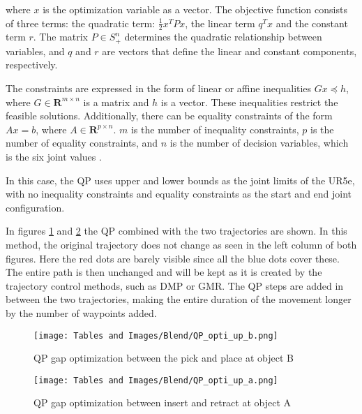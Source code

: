 \documentclass[Setup/main.tex]{subfiles}
\begin{document}
where $x$ is the optimization variable as a vector. The objective function consists of three terms: the quadratic term: $\frac{1}{2}x^T Px$, the linear term $q^Tx$ and the constant term $r$. The matrix $P \in S^n_+$ determines the quadratic relationship between variables, and $q$ and $r$ are vectors that define the linear and constant components, respectively.

The constraints are expressed in the form of linear or affine inequalities $Gx \preceq h$, where $G \in \boldsymbol{R}^{m \times n}$ is a matrix and $h$ is a vector. These inequalities restrict the feasible solutions. Additionally, there can be equality constraints of the form $Ax=b$, where $A \in \boldsymbol{R}^{p \times n}$. $m$ is the number of inequality constraints, $p$ is the number of equality constraints, and $n$ is the number of decision variables, which is the six joint values \cite{cvxbook}. 

In this case, the QP uses upper and lower bounds as the joint limits of the UR5e, with no inequality constraints and equality constraints as the start and end joint configuration.

In figures \ref{fig:QP_opti_up_b} and \ref{fig:QP_opti_up_a} the QP combined with the two trajectories are shown. In this method, the original trajectory does not change as seen in the left column of both figures. Here the red dots are barely visible since all the blue dots cover these. The entire path is then unchanged and will be kept as it is created by the trajectory control methods, such as DMP or GMR. The QP steps are added in between the two trajectories, making the entire duration of the movement longer by the number of waypoints added.

\begin{figure}[H]
    \centering
    \texttt{[image: Tables and Images/Blend/QP\_opti\_up\_b.png]}
    \caption{QP gap optimization between the pick and place at object B}
    \label{fig:QP_opti_up_b}
\end{figure}

\begin{figure}[H]
    \centering
    \texttt{[image: Tables and Images/Blend/QP\_opti\_up\_a.png]}
    \caption{QP gap optimization between insert and retract at object A}
    \label{fig:QP_opti_up_a}
\end{figure}
\end{document}
